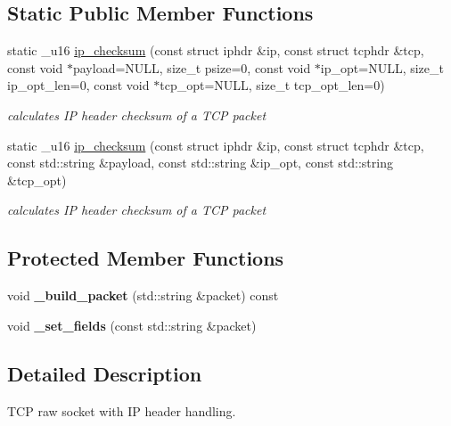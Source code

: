 \subsection*{Static Public Member Functions}
\begin{CompactItemize}
\item 
static \_\-u16 \hyperlink{classsocketpp_1_1TCP__IP__RawSocket_abc1c7904d5086de03ab11ae151813a7}{ip\_\-checksum} (const struct iphdr \&ip, const struct tcphdr \&tcp, const void $\ast$payload=NULL, size\_\-t psize=0, const void $\ast$ip\_\-opt=NULL, size\_\-t ip\_\-opt\_\-len=0, const void $\ast$tcp\_\-opt=NULL, size\_\-t tcp\_\-opt\_\-len=0)
\begin{CompactList}\small\item\em calculates IP header checksum of a TCP packet \item\end{CompactList}\item 
static \_\-u16 \hyperlink{classsocketpp_1_1TCP__IP__RawSocket_1fcccb3c1d1454997c08e7afe1518df7}{ip\_\-checksum} (const struct iphdr \&ip, const struct tcphdr \&tcp, const std::string \&payload, const std::string \&ip\_\-opt, const std::string \&tcp\_\-opt)
\begin{CompactList}\small\item\em calculates IP header checksum of a TCP packet \item\end{CompactList}\end{CompactItemize}
\subsection*{Protected Member Functions}
\begin{CompactItemize}
\item 
\hypertarget{classsocketpp_1_1TCP__IP__RawSocket_e624076d0f5f1f63bd8c13e97a7e46ce}{
void \textbf{\_\-build\_\-packet} (std::string \&packet) const }
\label{classsocketpp_1_1TCP__IP__RawSocket_e624076d0f5f1f63bd8c13e97a7e46ce}

\item 
\hypertarget{classsocketpp_1_1TCP__IP__RawSocket_f8f606ce33835813cc5c3a530e181432}{
void \textbf{\_\-set\_\-fields} (const std::string \&packet)}
\label{classsocketpp_1_1TCP__IP__RawSocket_f8f606ce33835813cc5c3a530e181432}

\end{CompactItemize}


\subsection{Detailed Description}
TCP raw socket with IP header handling. 

